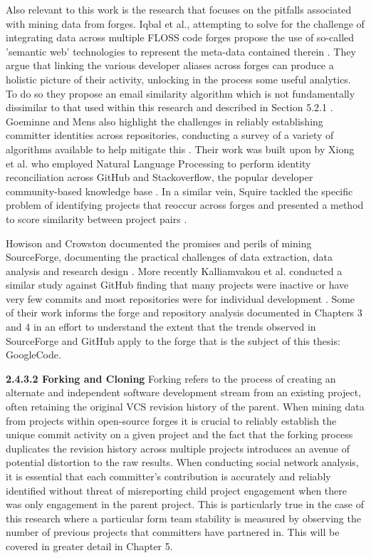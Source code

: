 Also relevant to this work is the research that focuses on the pitfalls associated with mining data from forges. Iqbal et al., attempting to solve for the challenge of integrating data across multiple FLOSS code forges propose the use of so-called 'semantic web' technologies to represent the meta-data contained therein \citep{iqbal2012integrating}. They argue that linking the various developer aliases across forges can produce a holistic picture of their activity, unlocking in the process some useful analytics. To do so they propose an email similarity algorithm which is not fundamentally dissimilar to that used within this research and described in Section 5.2.1 \citep{iqbal2015large}. Goeminne and Mens also highlight the challenges in reliably establishing committer identities across repositories, conducting a survey of a variety of algorithms available to help mitigate this \citep{goeminne2013comparison}. Their work was built upon by Xiong et al. who employed Natural Language Processing to perform identity reconciliation across GitHub and Stackoverflow, the popular developer community-based knowledge base \citep{xiong2017mining, github, stackoverflow}. In a similar vein, Squire tackled the specific problem of identifying projects that reoccur across forges and presented a method to score similarity between project pairs \citep{squire2009integrating}.

Howison and Crowston documented the promises and perils of mining SourceForge, documenting the practical challenges of data extraction, data analysis and research design \citep{howison2004perils}. More recently Kalliamvakou et al. conducted a similar study against GitHub finding that many projects were inactive or have very few commits and most repositories were for individual development \citep{kalliamvakou2014promises}. Some of their work informs the forge and repository analysis documented in Chapters 3 and 4 in an effort to understand the extent that the trends observed in SourceForge and GitHub apply to the forge that is the subject of this thesis: GoogleCode.

\newline
\textbf{2.4.3.2 Forking and Cloning}
\newline
Forking refers to the process of creating an alternate and independent software development stream from an existing project, often retaining the original VCS revision history of the parent. When mining data from projects within open-source forges it is crucial to reliably establish the unique commit activity on a given project and the fact that the forking process duplicates the revision history across multiple projects introduces an avenue of potential distortion to the raw results. When conducting social network analysis, it is essential that each committer's contribution is accurately and reliably identified without threat of misreporting child project engagement when there was only engagement in the parent project. This is particularly true in the case of this research where a particular form team stability is measured by observing the number of previous projects that committers have partnered in. This will be covered in greater detail in Chapter 5.

